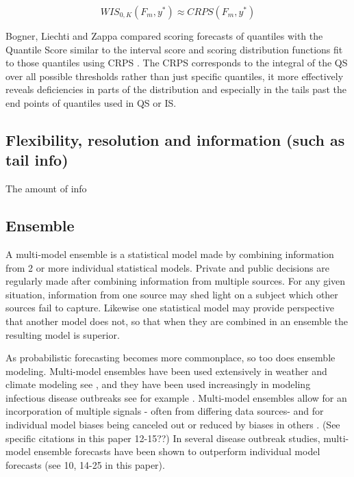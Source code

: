 \documentclass{article}\usepackage[]{graphicx}\usepackage[]{color}
\begin{document}
\begin{equation}
  WIS_{0,K}(F_m,y^*) \approx CRPS(F_m,y^*)
\end{equation}

Bogner, Liechti and Zappa compared scoring forecasts of quantiles with the 
Quantile Score similar to the interval score and scoring distribution functions
fit to those quantiles using CRPS \cite{bogner2017combining}. The CRPS 
corresponds to the integral of the QS over all possible thresholds rather than
just specific quantiles, it more effectively reveals deficiencies in parts of 
the distribution and especially in the tails past the end points of quantiles
used in QS or IS.





\subsection{Flexibility, resolution and information (such as tail info)}
The amount of info


\subsection{Ensemble}
A multi-model ensemble is a statistical model made by combining information from
2 or more individual statistical models. Private and public decisions are 
regularly made after combining information from multiple sources. For any given
situation, information from one source may shed light on a subject which other
sources fail to capture. Likewise one statistical model may provide perspective
that another model does not, so that when they are combined in an ensemble the 
resulting model is superior.

As probabilistic forecasting becomes more commonplace, so too does ensemble 
modeling. Multi-model ensembles have been used extensively in weather and
climate modeling see \cite{baran2018combining}, 
and they have been used increasingly in modeling infectious disease outbreaks
see for example \cite{yamana2016superensemble}. 
Multi-model ensembles allow for an incorporation of multiple signals -
often from differing data sources- and for individual model biases being canceled
out or reduced by biases in others \cite{reich2019accuracy}. (See specific citations in this paper 12-15??)
In several disease outbreak studies, multi-model ensemble forecasts have been 
shown to outperform individual model forecasts \cite{cramer2021evaluation} (see
10, 14-25 in this paper).
\end{document}
